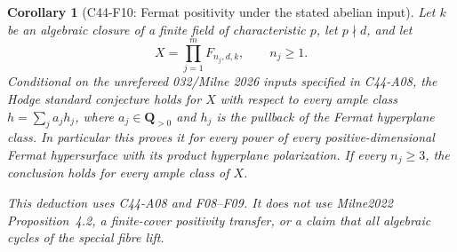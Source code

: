 \documentclass[11pt]{article}
\newtheorem{corollary}[theorem]{Corollary}
\theoremstyle{remark}\newtheorem{remark}[theorem]{Remark}
\begin{document}
\begin{corollary}[C44-F10: Fermat positivity under the stated abelian input]
\label{C44-F10}
Let $k$ be an algebraic closure of a finite field of characteristic
$p$, let $p\nmid d$, and let
\[
 X=\prod_{j=1}^{m}F_{n_j,d,k},\qquad n_j\geq1.
\]
Conditional on the unrefereed 032/Milne 2026 inputs specified in
C44-A08, the Hodge standard conjecture holds for $X$ with
respect to every ample class $h=\sum_j a_jh_j$, where
$a_j\in\mathbf Q_{>0}$ and $h_j$ is the pullback of the Fermat
hyperplane class. In particular this proves it for every power
of every positive-dimensional Fermat hypersurface with its product hyperplane
polarization. If every $n_j\geq3$, the conclusion holds for
every ample class of $X$.

This deduction uses C44-A08 and F08--F09. It does not use
Milne2022 Proposition~4.2, a finite-cover positivity transfer,
or a claim that all algebraic cycles of the special fibre lift.
\end{corollary}
\end{document}
